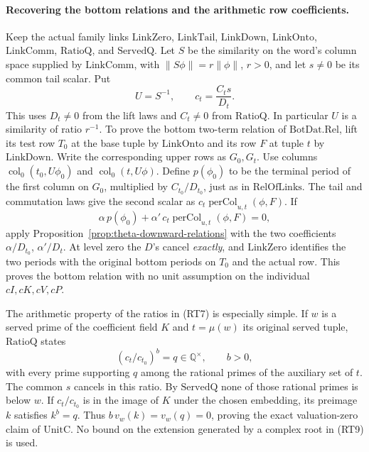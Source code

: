 \paragraph{Recovering the bottom relations and the arithmetic row
coefficients.}
Keep the actual family links \(\mathrm{LinkZero}\),
\(\mathrm{LinkTail}\), \(\mathrm{LinkDown}\), \(\mathrm{LinkOnto}\),
\(\mathrm{LinkComm}\), \(\mathrm{RatioQ}\), and
\(\mathrm{ServedQ}\). Let \(S\) be the similarity on the word's
column space supplied by \(\mathrm{LinkComm}\), with
\(\|S\phi\|=r\|\phi\|\), \(r>0\), and let \(s\ne0\) be its
common tail scalar. Put
\[
 U=S^{-1},\qquad c_t=\frac{C_t s}{D_t}.
 \tag{RT7}
\]
This uses \(D_t\ne0\) from the lift laws and \(C_t\ne0\)
from \(\mathrm{RatioQ}\). In particular \(U\) is a similarity of
ratio \(r^{-1}\). To prove the bottom two-term relation of
\(\mathrm{BotDat.Rel}\), lift its test row \(T_0\) at the base tuple
by \(\mathrm{LinkOnto}\) and its row \(F\) at tuple \(t\) by
\(\mathrm{LinkDown}\). Write the corresponding upper rows as
\(G_0,G_t\).
Use columns \(\operatorname{col}_0(t_0,U\phi_0)\) and
\(\operatorname{col}_0(t,U\phi)\). Define \(p(\phi_0)\) to be
the terminal period of the first column on \(G_0\), multiplied
by \(C_{t_0}/D_{t_0}\), just as in \(\mathrm{RelOfLinks}\).
The tail and commutation laws give the second scalar as
\(c_t\operatorname{perCol}_{u,t}(\phi,F)\).
If
\[
 \alpha\,p(\phi_0)+
 \alpha'\,c_t\operatorname{perCol}_{u,t}(\phi,F)=0 ,
 \tag{RT8}
\]
apply Proposition~\ref{prop:theta-downward-relations} with the
two coefficients \(\alpha/D_{t_0}\), \(\alpha'/D_t\).
At level zero the \(D\)'s cancel \emph{exactly}, and
\(\mathrm{LinkZero}\) identifies the two periods with the
original bottom periods on \(T_0\) and the actual row.
This proves the bottom relation with no unit assumption on
the individual \(cI,cK,cV,cP\).

The arithmetic property of the ratios in (RT7) is especially
simple. If \(w\) is a served prime of the coefficient field \(K\)
and \(t=\mu(w)\) its original served tuple, \(\mathrm{RatioQ}\)
states
\[
 \left(c_t/c_{t_0}\right)^b=q\in\mathbb Q^\times,\qquad b>0,
 \tag{RT9}
\]
with every prime supporting \(q\) among the rational primes
of the auxiliary set of \(t\).
The common \(s\) cancels in this ratio.
By \(\mathrm{ServedQ}\) none of those rational primes is below
\(w\). If \(c_t/c_{t_0}\) is in the image of \(K\) under the
chosen embedding, its preimage \(k\) satisfies \(k^b=q\).
Thus \(b\,v_w(k)=v_w(q)=0\), proving the exact valuation-zero
claim of \(\mathrm{UnitC}\). No bound on the extension generated
by a complex root in (RT9) is used.


